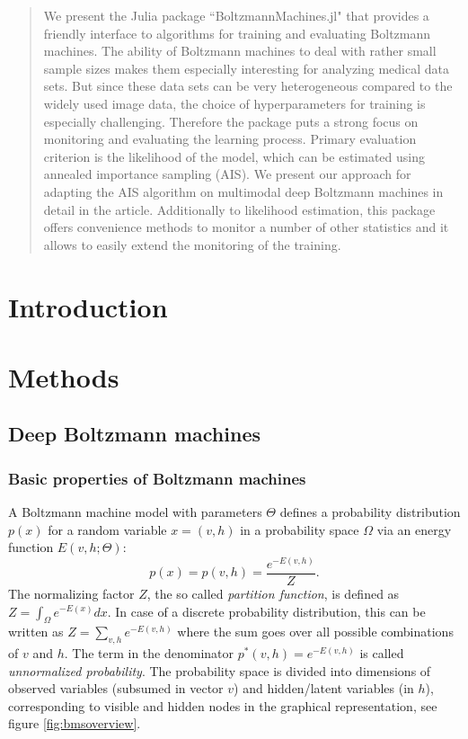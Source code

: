 \documentclass[12pt]{article}
\begin{document}

\tableofcontents
\newpage
\onehalfspacing

\begin{abstract}
We present the Julia package ``BoltzmannMachines.jl" that provides a friendly interface to algorithms for training and evaluating Boltzmann machines.
The ability of Boltzmann machines to deal with rather small sample sizes makes them especially interesting for analyzing medical data sets. But since these data sets can be very heterogeneous compared to the widely used image data, the choice of hyperparameters for training is especially challenging.
Therefore the package puts a strong focus on monitoring and evaluating the learning process.
Primary evaluation criterion is the likelihood of the model, which can be estimated using annealed importance sampling (AIS). We present our approach for adapting the AIS algorithm on multimodal deep Boltzmann machines in detail in the article.
Additionally to likelihood estimation, this package offers convenience methods to monitor a number of other statistics and it allows to easily extend the monitoring of the training.
\end{abstract}

\section{Introduction}
\section{Methods}
\subsection{Deep Boltzmann machines}
\subsubsection{Basic properties of Boltzmann machines}\label{basicbmproperties}

A Boltzmann machine model with parameters $\Theta$ defines a probability distribution $p(x)$ for a random variable $x = (v, h)$ in a probability space $\Omega$ via an energy function $E(v, h; \Theta)$:
\[
   p(x) = p(v, h) = \frac{e^{-E(v,h)}}{Z}.
\]
The normalizing factor $Z$, the so called \emph{partition function}, is defined as $Z = \int_{\Omega} e^{-E(x)} dx$. In case of a discrete probability distribution, this can be written as $Z = \sum_{v,h}e^{-E(v,h)}$ where the sum goes over all possible combinations of $v$ and $h$.
The term in the denominator $p^*(v,h) = e^{-E(v,h)}$ is called \emph{unnormalized probability}.
The probability space is divided into dimensions of observed variables (subsumed in vector $v$) and hidden/latent variables (in $h$), corresponding to visible and hidden nodes in the graphical representation, see figure \ref{fig:bmsoverview}.
\end{document}
